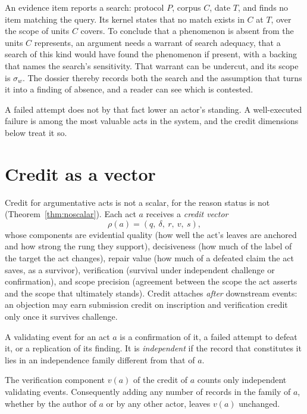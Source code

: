 \begin{example}\label{ex:search}
An evidence item reports a search: protocol $P$, corpus $C$, date $T$, and finds no item matching the query. Its kernel states that no match exists in $C$ at $T$, over the scope of units $C$ covers. To conclude that a phenomenon is absent from the units $C$ represents, an argument needs a warrant of search adequacy, that a search of this kind would have found the phenomenon if present, with a backing that names the search's sensitivity. That warrant can be undercut, and its scope is $\sigma_w$. The dossier thereby records both the search and the assumption that turns it into a finding of absence, and a reader can see which is contested.
\end{example}

A failed attempt does not by that fact lower an actor's standing. A well-executed failure is among the most valuable acts in the system, and the credit dimensions below treat it so.

\section{Credit as a vector}\label{sec:credit}

Credit for argumentative acts is not a scalar, for the reason status is not (Theorem~\ref{thm:noscalar}). Each act $a$ receives a \emph{credit vector}
\[
\rho(a)=(q,\ \delta,\ r,\ v,\ s),
\]
whose components are evidential quality (how well the act's leaves are anchored and how strong the rung they support), decisiveness (how much of the label of the target the act changes), repair value (how much of a defeated claim the act saves, as a survivor), verification (survival under independent challenge or confirmation), and scope precision (agreement between the scope the act asserts and the scope that ultimately stands). Credit attaches \emph{after} downstream events: an objection may earn submission credit on inscription and verification credit only once it survives challenge.

\begin{definition}\label{def:validating}
A validating event for an act $a$ is a confirmation of it, a failed attempt to defeat it, or a replication of its finding. It is \emph{independent} if the record that constitutes it lies in an independence family different from that of $a$.
\end{definition}

\begin{proposition}\label{prop:noself}
The verification component $v(a)$ of the credit of $a$ counts only independent validating events. Consequently adding any number of records in the family of $a$, whether by the author of $a$ or by any other actor, leaves $v(a)$ unchanged.
\end{proposition}

